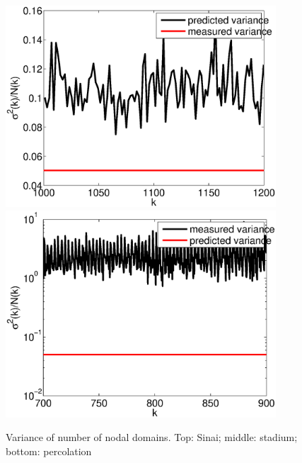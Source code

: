 \documentclass{report}
\begin{document}
\begin{figure}
  \begin{center}
    \includegraphics[width=0.9\textwidth]{figs/results/qugrs_1000_to_1200_variance.eps}
    \includegraphics[width=0.9\textwidth]{figs/results/qust_700_to_900_variance.eps}

    \caption{Variance of number of nodal domains. Top: Sinai; middle: stadium; bottom: percolation}
    \label{fig:variance}
  \end{center}
\end{figure}
\end{document}
